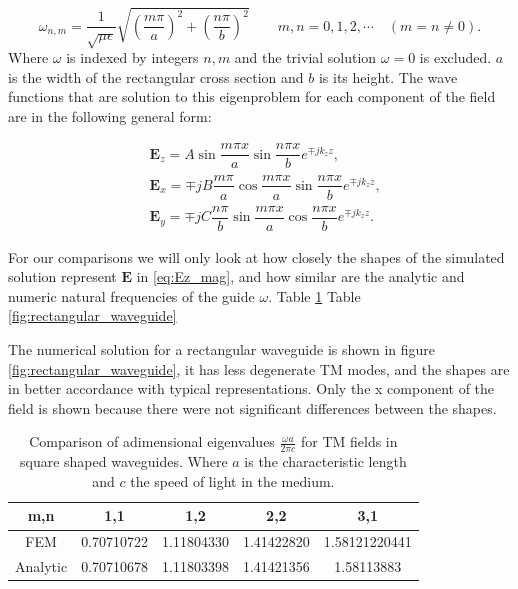 \begin{equation}
\omega_{n,m} = \frac{1}{\sqrt{\mu\epsilon}}\sqrt{\left(\frac{m\pi}{a}\right)^2+\left(\frac{n\pi}{b}\right)^2}
\qquad m,n = 0,1,2,\cdots \quad (m=n\neq0).
\label{eq:eig_vals_sqare_waveguide}
\end{equation}
Where $\omega$ is indexed by integers $n,m$ and the trivial solution $\omega = 0$ is excluded. $a$ is the width of the rectangular cross section and $b$ is its height.
The wave functions that are solution to this eigenproblem for each component of the field are in the following general form:

\begin{align}
&\mathbf{E}_z = A\sin{\dfrac{m\pi x}{a}}\sin{\dfrac{n\pi x}{b}}e^{\mp jk_zz}, \label{eq:Ez_mag}\\
&\mathbf{E}_x =\mp jB\dfrac{m\pi}{a}\cos{\dfrac{m\pi x}{a}}\sin{\dfrac{n\pi x}{b}}e^{\mp jk_zz},\\
&\mathbf{E}_y =\mp jC\dfrac{n\pi}{b}\sin{\dfrac{m\pi x}{a}}\cos{\dfrac{n\pi x}{b}}e^{\mp jk_zz}.
\end{align}

For our comparisons we will only look at how closely the shapes of the simulated solution represent $\mathbf{E}$ in  \ref{eq:Ez_mag}, and how similar are the analytic and numeric  natural frequencies of the guide $\omega$.  Table \ref{tab:sq_wav_comparison}  Table \ref{fig:rectangular_waveguide} 

The numerical solution for a rectangular waveguide is shown in figure \ref{fig:rectangular_waveguide}, it has less degenerate TM modes, and the shapes are in better accordance with typical representations. Only the x component of the field is shown because there were not significant differences between the shapes.
\begin{table}
\begin{center}
\begin{tabular}{|c|c|c|c|c|}
\hline 
m,n & 1,1 & 1,2 & 2,2 & 3,1 \\ 
\hline 
FEM  & 0.70710722 &  1.11804330  &  1.41422820 & 1.58121220441 \\ 
\hline 
Analytic  & 0.70710678 &  1.11803398 &  1.41421356 &  1.58113883 \\
\hline 
\end{tabular} 
\caption{Comparison of adimensional eigenvalues $\frac{\omega a}{2\pi c}$ for TM fields in square shaped waveguides. Where $a$ is the characteristic length and $c$ the speed of light in the medium.}
\end{center}
\label{tab:sq_wav_comparison}
\end{table}


